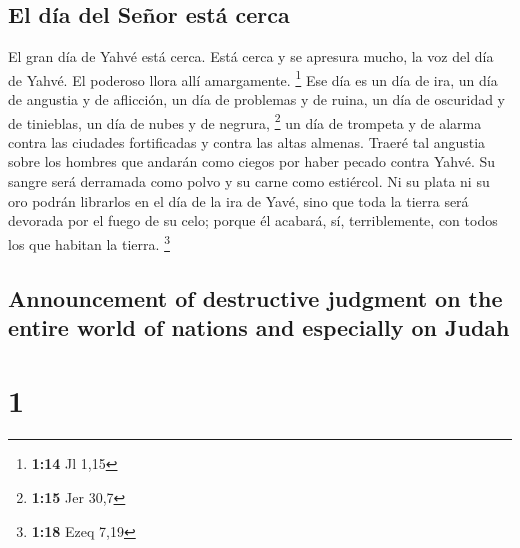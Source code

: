 \begin{paracol}{2}
\hypertarget{el-duxeda-del-seuxf1or-estuxe1-cerca}{%
\subsection{El día del Señor está
cerca}\label{el-duxeda-del-seuxf1or-estuxe1-cerca}}

 El gran día de Yahvé está cerca. Está cerca y se
apresura mucho, la voz del día de Yahvé. El poderoso llora allí
amargamente. \footnote{\textbf{1:14} Jl 1,15}  Ese día es
un día de ira, un día de angustia y de aflicción, un día de problemas y
de ruina, un día de oscuridad y de tinieblas, un día de nubes y de
negrura, \footnote{\textbf{1:15} Jer 30,7}  un día de
trompeta y de alarma contra las ciudades fortificadas y contra las altas
almenas.  Traeré tal angustia sobre los hombres que
andarán como ciegos por haber pecado contra Yahvé. Su sangre será
derramada como polvo y su carne como estiércol.  Ni su
plata ni su oro podrán librarlos en el día de la ira de Yavé, sino que
toda la tierra será devorada por el fuego de su celo; porque él acabará,
sí, terriblemente, con todos los que habitan la tierra. \footnote{\textbf{1:18}
  Ezeq 7,19}

\switchcolumn
\begin{otherlanguage}{english}

\hypertarget{announcement-of-destructive-judgment-on-the-entire-world-of-nations-and-especially-on-judah}{%
\subsection{Announcement of destructive judgment on the entire world of
nations and especially on
Judah}\label{announcement-of-destructive-judgment-on-the-entire-world-of-nations-and-especially-on-judah}}

\hypertarget{section-1}{%
\section{1}\label{section-1}}


\end{otherlanguage}
\end{paracol}
